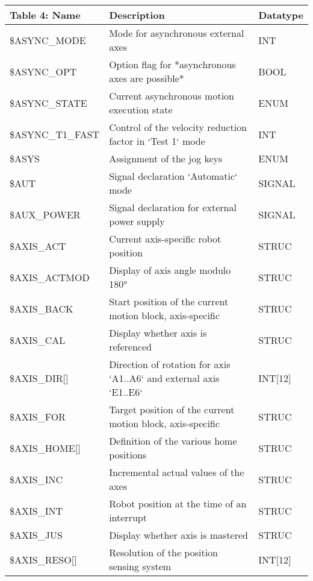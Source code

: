 \begin{appendices}
        \newpage
        \begin{tabular}{|p{}|p{}|p{}|}
        \hline
        \textbf{Table 4: Name} & \textbf{Description} & \textbf{Datatype} \\ \hline
        \$ASYNC\_MODE & Mode for asynchronous external axes & INT \\ \hline
        \$ASYNC\_OPT & Option flag for *asynchronous axes are possible* & BOOL \\ \hline
        \$ASYNC\_STATE & Current asynchronous motion execution state & ENUM \\ \hline
        \$ASYNC\_T1\_FAST & Control of the velocity reduction factor in `Test 1` mode & INT \\ \hline
        \$ASYS & Assignment of the jog keys & ENUM \\ \hline
        \$AUT & Signal declaration `Automatic` mode & SIGNAL \\ \hline
        \$AUX\_POWER & Signal declaration for external power supply & SIGNAL \\ \hline
        \$AXIS\_ACT & Current axis-specific robot position & STRUC \\ \hline
        \$AXIS\_ACTMOD & Display of axis angle modulo 180° & STRUC \\ \hline
        \$AXIS\_BACK & Start position of the current motion block, axis-specific & STRUC \\ \hline
        \$AXIS\_CAL & Display whether axis is referenced & STRUC \\ \hline
        \$AXIS\_DIR[] & Direction of rotation for axis `A1..A6` and external axis `E1..E6` & INT[12] \\ \hline
        \$AXIS\_FOR & Target position of the current motion block, axis-specific & STRUC \\ \hline
        \$AXIS\_HOME[] & Definition of the various home positions & STRUC \\ \hline
        \$AXIS\_INC & Incremental actual values of the axes & STRUC \\ \hline
        \$AXIS\_INT & Robot position at the time of an interrupt & STRUC \\ \hline
        \$AXIS\_JUS & Display whether axis is mastered & STRUC \\ \hline
        \$AXIS\_RESO[] & Resolution of the position sensing system & INT[12] \\ \hline
        \end{tabular}
        

\end{appendices}
